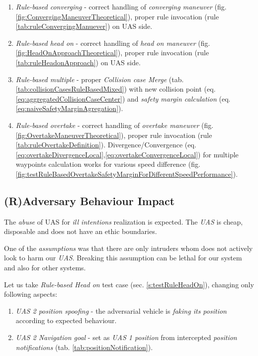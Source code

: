 \begin{enumerate}
    \item \emph{Rule-based converging} - correct handling of \emph{converging maneuver} (fig. \ref{fig:ConvergingManeuverTheoretical}), proper rule invocation (rule \ref{tab:ruleConvergingManuever}) on UAS side.
    
    \item \emph{Rule-based head on} - correct handling of \emph{head on maneuver} (fig. \ref{fig:HeadOnApproachTheoretical}), proper rule invocation (rule \ref{tab:ruleHeadonApproach}) on UAS side. 
    
    \item \emph{Rule-based multiple} - proper \emph{Collision case Merge} (tab. \ref{tab:collisionCasesRuleBasedMixed}) with new collision point (eq. \ref{eq:aggregatedCollisionCaseCenter}) and \emph{safety margin calculation} (eq. \ref{eq:naiveSafetyMarginAgregation}).
    
    \item \emph{Rule-based overtake} - correct handling of \emph{overtake maneuver} (fig. \ref{fig:OvertakeManeuverTheoretical}), proper rule invocation (rule \ref{tab:ruleOvertakeDefinition}). Divergence/Convergence (eq. \ref{eq:overtakeDivergenceLocal},\ref{eq:overtakeConvergenceLocal}) for multiple waypoints calculation works for various speed difference (fig. \ref{fig:testRuleBasedOvertakeSafetyMarginForDifferentSpeedPerformance}).
\end{enumerate}

\subsection{(R)Adversary Behaviour Impact}\label{s:adversadialBehaviourImpact}

The \emph{abuse} of UAS for \emph{ill intentions} realization is expected. The \emph{UAS} is cheap, disposable and does not have an ethic boundaries. 

One of the \emph{assumptions} was that there are only intruders whom does not actively look to harm our \emph{UAS}. Breaking this assumption can be lethal for our system and also for other systems. 

Let us take \emph{Rule-based Head on} test case (sec. \ref{s:testRuleHeadOn}), changing only following aspects:
\begin{enumerate}
	\item \emph{UAS 2 position spoofing} - the adversarial vehicle is \emph{faking its position} according to expected behaviour.
	\item \emph{UAS 2 Navigation goal} - set as \emph{UAS 1 position} from intercepted \emph{position notifications} (tab. \ref{tab:positionNotification}).
\end{enumerate}


